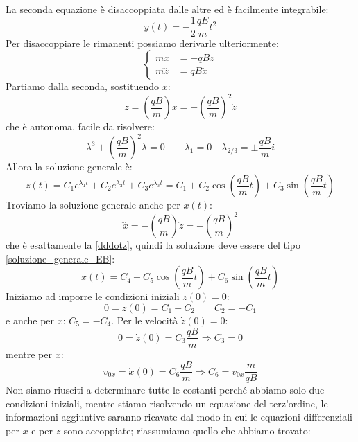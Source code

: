 La seconda equazione è disaccoppiata dalle altre ed è facilmente integrabile:
\begin{equation}
	y(t)=-\frac{1}{2}\frac{qE}{m}t^2
\end{equation}
Per disaccoppiare le rimanenti possiamo derivarle ulteriormente:
\begin{equation}
	\left\{
	\begin{aligned}
		m\dddot x & =-qB\ddot z \\
		m\dddot z & =qB\ddot x
	\end{aligned}
	\right.
\end{equation}
Partiamo dalla seconda, sostituendo $\ddot x$:
\begin{equation}
	\dddot z=\left(\frac{qB}{m}\right)\ddot x=-\left(\frac{qB}{m}\right)^2\dot z
	\label{dddotz}
\end{equation}
che è autonoma, facile da risolvere:
\[
	\lambda^3+\left(\frac{qB}{m}\right)^2\lambda=0\qquad\lambda_1=0\quad\lambda_{2/3}=\pm\frac{qB}{m}i
\]
Allora la soluzione generale è:
\begin{equation}
	z(t)=C_1 e^{\lambda_1t}+C_2 e^{\lambda_2t}+C_3 e^{\lambda_3t}=C_1+C_2\cos\left(\frac{qB}{m}t\right)+C_3\sin\left(\frac{qB}{m}t\right)
	\label{soluzione_generale_EB}
\end{equation}
Troviamo la soluzione generale anche per $x(t)$:
\begin{equation}
	\dddot x=-\left(\frac{qB}{m}\right)\ddot z=-\left(\frac{qB}{m}\right)^2
\end{equation}
che è esattamente la \eqref{dddotz}, quindi la soluzione deve essere del tipo \eqref{soluzione_generale_EB}:
\begin{equation}
	x(t)=C_4+C_5\cos\left(\frac{qB}{m}t\right)+C_6\sin\left(\frac{qB}{m}t\right)
\end{equation}
Iniziamo ad imporre le condizioni iniziali $z(0)=0$:
\begin{equation}
	0=z(0)=C_1+C_2\qquad C_2=-C_1
\end{equation}
e anche per $x$: $C_5=-C_4$. Per le velocità $\dot z(0)=0$:
\begin{equation}
	0=\dot z(0)=C_3\frac{qB}{m}\Rightarrow C_3=0
\end{equation}
mentre per $x$:
\begin{equation}
	v_{0x}=\dot x(0)=C_6\frac{qB}{m}\Rightarrow C_6=v_{0x}\frac{m}{qB}
\end{equation}
Non siamo riusciti a determinare tutte le costanti perché abbiamo solo due condizioni iniziali, mentre stiamo risolvendo un equazione del terz'ordine, le informazioni aggiuntive saranno ricavate dal modo in cui le equazioni differenziali per $x$ e per $z$ sono accoppiate; riassumiamo quello che abbiamo trovato:
